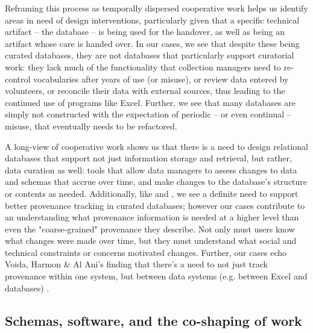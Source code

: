 Reframing this process as temporally dispersed cooperative work helps us identify areas in need of design interventions, particularly given that a specific technical artifact -- the database -- is being used for the handover, as well as being an artifact whose care is handed over. In our cases, we see that despite these being curated databases, they are not databases that particularly support curatorial work: they lack much of the functionality that collection managers need to re-control vocabularies after years of use (or misuse), or review data entered by volunteers, or reconcile their data with external sources, thus leading to the continued use of programs like Excel. Further, we see that many databases are simply not constructed with the expectation of periodic -- or even continual -- misuse, that eventually needs to be refactored.

A long-view of cooperative work shows us that there is a need to design relational databases that support not just information storage and retrieval, but rather, data curation as well: tools that allow data managers to assess changes to data and schemas that accrue over time, and make changes to the database's structure or contents as needed. Additionally, like \cite{Buneman_2006} and \cite{jagadish2007making}, we see a definite need to support better provenance tracking in curated databases; however our cases contribute to an understanding what provenance information is needed at a higher level than even the "coarse-grained" provenance they describe. Not only must users know what changes were made over time, but they must understand what social and technical constraints or concerns motivated changes. Further, our cases echo Voida, Harmon & Al Ani's finding that there's a need to not just track provenance within one system, but between data systems (e.g. between Excel and databases) \cite{voida2011homebrew}.

\subsection{Schemas, software, and the co-shaping of work}

